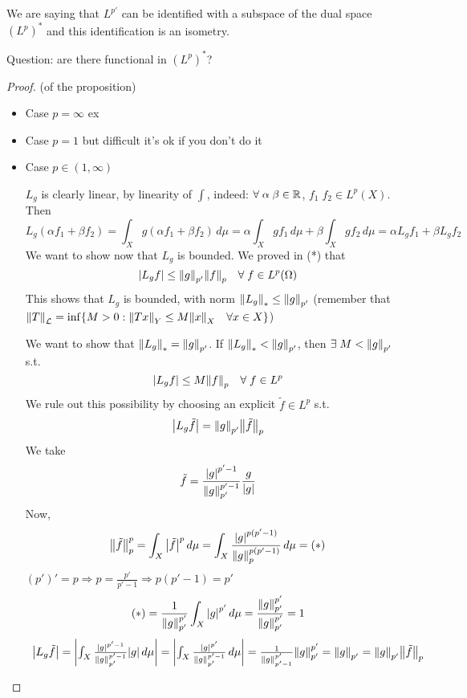\begin{remark}
    We are saying that \(L^{p'}\) can be identified with a subspace of the dual space \((L^p)^*\) and this identification is an isometry.
\end{remark}

Question: are there functional in \((L^p)^*\)?

\begin{proof}
    (of the proposition)
    \begin{itemize}
        \item Case \(p=\infty\) ex
        \item Case \(p=1\) but difficult it's ok if you don't do it
        \item Case \(p \in (1, \infty)\)
        
        \(L_g\) is clearly linear, by linearity of \(\int\), indeed:
        \(\forall \; \alpha \; \beta \in \mathbb{R}\), \(f_1 \; f_2 \in L^p(X)\). Then
        \[
            L_g(\alpha f_1 + \beta f_2) = \int_X g (\alpha f_1 + \beta f_2) \, d\mu = \alpha \int_X g f_1 \, d\mu + \beta \int_X g f_2 \, d\mu = \alpha L_g f_1 + \beta L_g f_2
        \]
        We want to show now that \(L_g \) is bounded. 
        We proved in (*) that 
        \[
            \abs{L_g f} \leq \norm{g}_{p'} \norm{f}_p \quad \forall \; f \in L^p(\Omega)
        \]
        This shows that \(L_g\) is bounded, with norm  \(\norm{L_g}_* \leq \norm{g}_{p'}\) (remember that \(\norm{T}_\mathcal{L} = \inf \{ M>0: \norm{Tx} _Y \leq M \norm{x}_X \quad \forall x \in X\} \))

        We want to show that \(\norm{L_g}_* = \norm{g}_{p'}\). If \(\norm{L_g}_* < \norm{g}_{p'}\), then \(\exists \; M < \norm{g}_{p'}\) s.t. 
        \[
            \abs{L_g f } \leq M \norm{f}_p \quad \forall \; f \in L^p
        \]
        We rule out this possibility by choosing an explicit \(\tilde{f} \in L^p \) s.t.
        \[
            \abs{L_g \tilde{f} } = \norm{g}_{p'} \norm{\tilde{f}}_p
        \]
        We take 
        \[
            \tilde{f} = \frac{\abs{g}^{p'-1}}{\norm{g}_{p'}^{p'-1}} \frac{g}{\abs{g}}
        \]
        Now, 
        \[
            \norm{\tilde{f}}_p^p = \int_X \abs{\tilde{f}}^p \, d\mu = \int_X \frac{\abs{g}^{p(p'-1)}}{\norm{g}_p^{p(p'-1)}} \, d\mu = (*)
        \]
        \((p')' = p \Rightarrow p=\frac{p'}{p'-1} \Rightarrow p(p'-1) = p'\)
        \[
            (*) = \frac{1}{\norm{g}_{p'}^{p'}} \int_X \abs{g}^{p'} \, d\mu = \frac{\norm{g}_{p'}^{p'}}{\norm{g}_{p'}^{p'}} = 1
        \]    
        \[
            \begin{array}{l}
            \abs{L_g \tilde{f}} = \abs{\int_X \frac{\abs{g}^{p'-1}}{\norm{g}_{p'}^{p'-1}} \abs{g} \, d\mu}
            = \abs{\int_X \frac{\abs{g}^{p'}}{\norm{g}_{p'}^{p'-1}} \, d\mu }
            = \frac{1}{\norm{g}_{p'-1}^{p'}} \norm{g}_{p'}^{p'} 
            = \norm{g}_{p'} = \norm{g}_{p'}\norm{\tilde{f}}_p
        \end{array}
            \]
    \end{itemize}
\end{proof}

